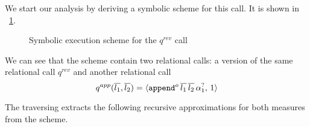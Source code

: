 We start our analysis by deriving a symbolic scheme for this call. It is shown in \figureword~\ref{fig:reverso_scheme}.

\begin{figure}[t]
\begin{center}
\end{center}

\caption{Symbolic execution scheme for the $q^{rev}$ call}
\label{fig:reverso_scheme}
\end{figure}


We can see that the scheme contain two relational calls: a version of the same relational call $q^{rev}$ and another relational call \[ q^{app}(\overline{l_1}, \overline{l_2}) = \langle \texttt{append$^o$} \, \overline{l_1} \, \overline{l_2} \, \alpha_1^?  ,\, 1 \rangle \]

The traversing extracts the following recursive approximations for both measures from the scheme.

